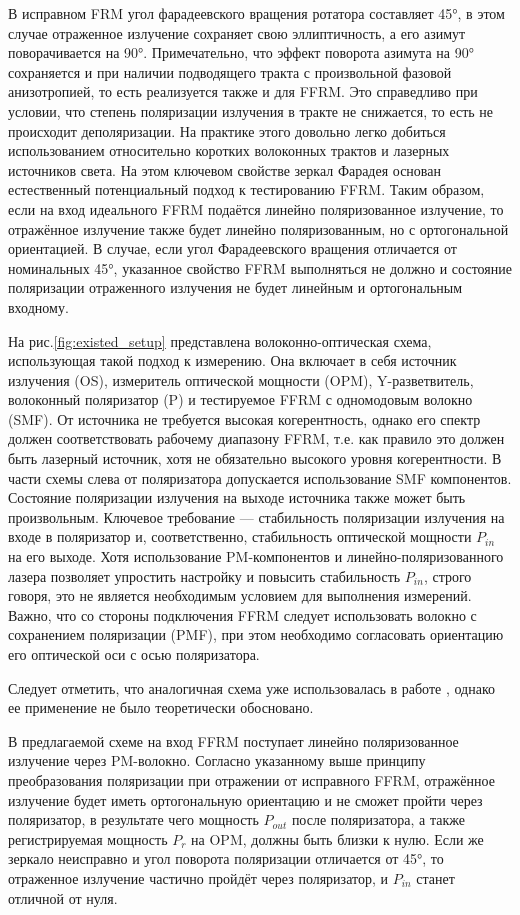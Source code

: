 \documentclass{article}
\begin{document}
В исправном FRM угол фарадеевского вращения ротатора составляет 45°, в этом случае отраженное излучение сохраняет свою эллиптичность, а его азимут поворачивается на 90°.  Примечательно, что эффект поворота азимута на 90° сохраняется и при наличии подводящего тракта с произвольной фазовой анизотропией, то есть реализуется также и для FFRM. Это справедливо при условии, что степень поляризации излучения в тракте не снижается, то есть не происходит деполяризации. На практике этого довольно легко добиться использованием относительно коротких волоконных трактов и лазерных источников света. На этом ключевом свойстве зеркал Фарадея основан естественный потенциальный подход к тестированию FFRM. Таким образом, если на вход идеального FFRM подаётся линейно поляризованное излучение, то отражённое излучение также будет линейно поляризованным, но с ортогональной ориентацией. В случае, если угол Фарадеевского вращения отличается от номинальных 45°, указанное свойство FFRM выполняться не должно и состояние поляризации отраженного излучения не будет линейным и ортогональным входному. 

На рис.\ref{fig:existed_setup} представлена волоконно-оптическая схема, использующая такой подход к измерению. Она включает в себя источник излучения (OS), измеритель оптической мощности (OPM), Y-разветвитель, волоконный поляризатор (P) и тестируемое FFRM с одномодовым волокно (SMF). От источника не требуется высокая когерентность, однако его спектр должен соответствовать рабочему диапазону FFRM, т.е. как правило это должен быть лазерный источник, хотя не обязательно высокого уровня когерентности. В части схемы слева от поляризатора допускается использование SMF компонентов. Состояние поляризации излучения на выходе источника также может быть произвольным. Ключевое требование — стабильность поляризации излучения на входе в поляризатор и, соответственно, стабильность оптической мощности $P_{in}$ на его выходе. Хотя использование PM-компонентов и линейно-поляризованного лазера позволяет упростить настройку и повысить стабильность $P_{in}$, строго говоря, это не является необходимым условием для выполнения измерений. Важно, что со стороны подключения FFRM следует использовать волокно с сохранением поляризации (PMF), при этом необходимо согласовать ориентацию его оптической оси с осью поляризатора.

Следует отметить, что аналогичная схема уже использовалась в работе \autocite{wanTwoinoneFaradayRotator2014}, однако ее применение не было теоретически обосновано.

В предлагаемой схеме на вход FFRM поступает линейно поляризованное излучение через PM-волокно. Согласно указанному выше принципу преобразования поляризации при отражении от исправного FFRM, отражённое излучение будет иметь ортогональную ориентацию и не сможет пройти через поляризатор, в результате чего мощность $P_{out}$ после поляризатора, а также регистрируемая мощность $P_{r}$ на OPM, должны быть близки к нулю. Если же зеркало неисправно и угол поворота поляризации отличается от 45°, то отраженное излучение частично пройдёт через поляризатор, и $P_{in}$ станет отличной от нуля.
\end{document}
